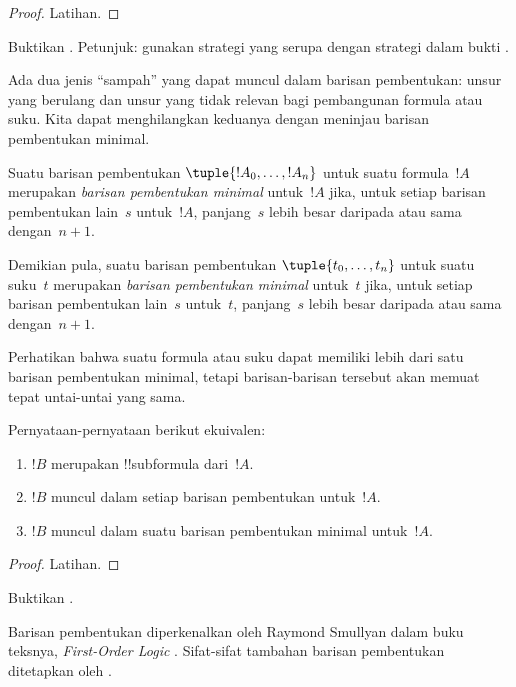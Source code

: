 \documentclass[../../../include/open-logic-section]{subfiles}
\begin{document}
\begin{proof}
Latihan.
\end{proof}

\begin{prob}
Buktikan .
Petunjuk: gunakan strategi yang serupa dengan strategi dalam bukti
.
\end{prob}

Ada dua jenis ``sampah'' yang dapat muncul dalam barisan pembentukan: unsur
yang berulang dan unsur yang tidak relevan bagi pembangunan formula atau
suku. Kita dapat menghilangkan keduanya dengan meninjau barisan pembentukan
minimal.

\begin{defn}
Suatu barisan pembentukan $\tuple{!A_0, \ldots, !A_n}$ untuk suatu
formula~$!A$ merupakan \emph{barisan pembentukan minimal} untuk~$!A$ jika,
untuk setiap barisan pembentukan lain~$s$ untuk~$!A$, panjang~$s$ lebih
besar daripada atau sama dengan~$n+1$.

Demikian pula, suatu barisan pembentukan $\tuple{t_0, \ldots, t_n}$ untuk
suatu suku~$t$ merupakan \emph{barisan pembentukan minimal} untuk~$t$ jika,
untuk setiap barisan pembentukan lain~$s$ untuk~$t$, panjang~$s$ lebih besar
daripada atau sama dengan~$n+1$.
\end{defn}

Perhatikan bahwa suatu formula atau suku dapat memiliki lebih dari satu
barisan pembentukan minimal, tetapi barisan-barisan tersebut akan memuat
tepat untai-untai yang sama.

\begin{prop}
Pernyataan-pernyataan berikut ekuivalen:
\begin{enumerate}
    \item $!B$ merupakan !!{subformula} dari~$!A$.
    \item $!B$ muncul dalam setiap barisan pembentukan untuk~$!A$.
    \item $!B$ muncul dalam suatu barisan pembentukan minimal untuk~$!A$.
\end{enumerate}
\end{prop}

\begin{proof}
Latihan.
\end{proof}

\begin{prob}
Buktikan .
\end{prob}

\begin{history}
Barisan pembentukan diperkenalkan oleh Raymond Smullyan dalam buku teksnya,
\emph{First-Order Logic} \citep{Smullyan1968}. Sifat-sifat tambahan barisan
pembentukan ditetapkan oleh \citet{Zuckerman1973}.
\end{history}
\end{document}
